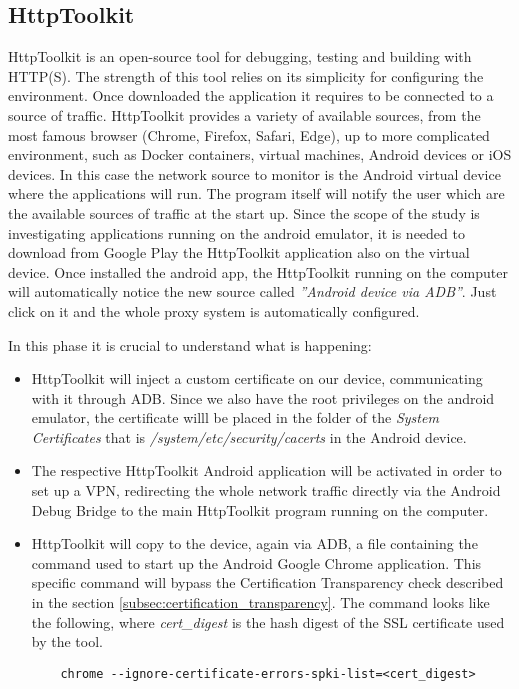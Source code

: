 		\subsection{HttpToolkit}
		\label{sec:http_toolkit}
			\par HttpToolkit\cite{http_toolkit} is an open-source tool for debugging, testing and building with HTTP(S). The strength of this tool relies on its simplicity for configuring the environment. Once downloaded the application it requires to be connected to a source of traffic. HttpToolkit provides a variety of available sources, from the most famous browser (Chrome, Firefox, Safari, Edge), up to more complicated environment, such as Docker containers, virtual machines, Android devices or iOS devices. In this case the network source to monitor is the Android virtual device where the applications will run. The program itself will notify the user which are the available sources of traffic at the start up. Since the scope of the study is investigating applications running on the android emulator, it is needed to download from Google Play the HttpToolkit application also on the virtual device. Once installed the android app, the HttpToolkit running on the computer will automatically notice the new source called \textit{''Android device via ADB''}. Just click on it and the whole proxy system is automatically configured. \newline
			\par In this phase it is crucial to understand what is happening:
			\begin{itemize}
				\item HttpToolkit will inject a custom certificate on our device, communicating with it through ADB. Since we also have the root privileges on the android emulator, the certificate willl be placed in the folder of the \textit{System Certificates} that is \textit{/system/etc/security/cacerts} in the Android device. \newline
				\item The respective HttpToolkit Android application will be activated in order to set up a VPN, redirecting the whole network traffic directly via the Android Debug Bridge to the main HttpToolkit program running on the computer. \newline
				\item HttpToolkit will copy to the device, again via ADB, a file containing the command used to start up the Android Google Chrome application. This specific command will bypass the Certification Transparency check described in the section \ref{subsec:certification_transparency}. The command looks like the following, where \textit{cert\_digest} is the hash digest of the SSL certificate used by the tool.
\begin{lstlisting}
	chrome --ignore-certificate-errors-spki-list=<cert_digest>
\end{lstlisting}
			\end{itemize} 
